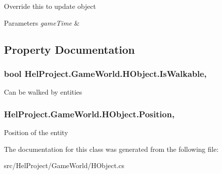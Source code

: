 Override this to update object 


\begin{DoxyParams}{Parameters}
{\em game\+Time} & \\
\hline
\end{DoxyParams}


\subsection{Property Documentation}
\hypertarget{class_hel_project_1_1_game_world_1_1_h_object_a97444e657db0148fb442570fbd7fe98f}{}
\subsubsection[{Is\+Walkable}]{\setlength{\rightskip}{0pt plus 5cm}bool Hel\+Project.\+Game\+World.\+H\+Object.\+Is\+Walkable\hspace{0.3cm}{\ttfamily [get]}, {\ttfamily [set]}}\label{class_hel_project_1_1_game_world_1_1_h_object_a97444e657db0148fb442570fbd7fe98f}


Can be walked by entities 

\hypertarget{class_hel_project_1_1_game_world_1_1_h_object_ac7f41f5a7036bbc845fea1b27bb9d110}{}
\subsubsection[{Position}]{ Hel\+Project.\+Game\+World.\+H\+Object.\+Position\hspace{0.3cm}{\ttfamily [get]}, {\ttfamily [set]}}\label{class_hel_project_1_1_game_world_1_1_h_object_ac7f41f5a7036bbc845fea1b27bb9d110}


Position of the entity 



The documentation for this class was generated from the following file\+:\begin{DoxyCompactItemize}
\item 
src/\+Hel\+Project/\+Game\+World/H\+Object.\+cs\end{DoxyCompactItemize}
